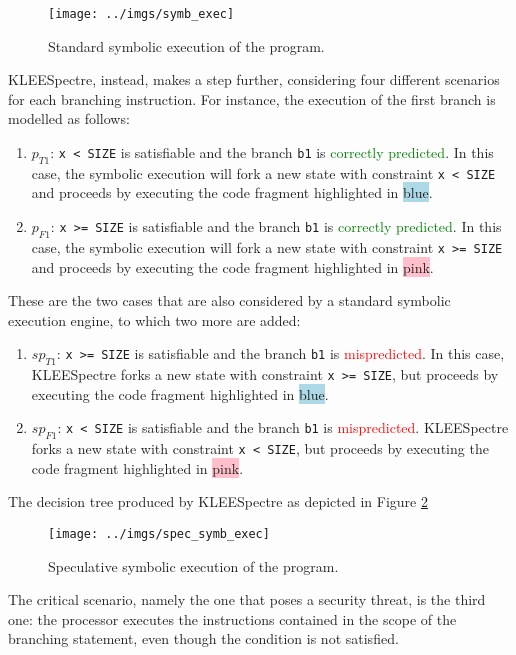 \documentclass[12pt,a4paper]{book}
\theoremstyle{definition}
\begin{document}
	\begin{figure}[!h]
		\centering
		\texttt{[image: ../imgs/symb\_exec]}
		\caption{Standard symbolic execution of the program.}
		\label{fig:standars_symb_exec}
	\end{figure}
	KLEESpectre, instead, makes a step further, considering four different scenarios for each branching instruction. For instance, the execution of the first branch is modelled as follows: 
	\begin{enumerate}
		\item $p_{T1}$: \texttt{x < SIZE} is satisfiable and the branch \texttt{b1} is \textcolor{green}{correctly predicted}. In this case, the symbolic execution will fork a new state with constraint \texttt{x < SIZE} and proceeds by executing the code fragment highlighted in \colorbox{lightblue}{blue}.
		\item $p_{F1}$: \texttt{x >= SIZE} is satisfiable and the branch \texttt{b1} is \textcolor{green}{correctly predicted}. In this case, the symbolic execution will fork a new state with constraint \texttt{x >= SIZE} and proceeds by executing the code fragment highlighted in \colorbox{pink}{pink}.
	\end{enumerate}
	These are the two cases that are also considered by a standard symbolic execution engine, to which two more are added:
	\begin{enumerate}[resume]
		\item $sp_{T1}$: \texttt{x >= SIZE} is satisfiable and the branch \texttt{b1} is \textcolor{red}{mispredicted}. In this case, KLEESpectre forks a new state with constraint \texttt{x >= SIZE}, but proceeds by executing the code fragment highlighted in \colorbox{lightblue}{blue}.
		\item $sp_{F1}$: \texttt{x < SIZE} is satisfiable and the branch \texttt{b1} is \textcolor{red}{mispredicted}. KLEESpectre forks a new state with constraint \texttt{x < SIZE}, but proceeds by executing the code fragment highlighted in \colorbox{pink}{pink}.
	\end{enumerate}
	The decision tree produced by KLEESpectre as depicted in Figure \ref{fig:spec_symb_exec}
	
	\begin{figure}[!h]
		\centering
		\texttt{[image: ../imgs/spec\_symb\_exec]}
		\caption{Speculative symbolic execution of the program.}
		\label{fig:spec_symb_exec}
	\end{figure}
	
	The critical scenario, namely the one that poses a security threat, is the third one: the processor executes the instructions contained in the scope of the branching statement, even though the condition is not satisfied. 
	
\end{document}
